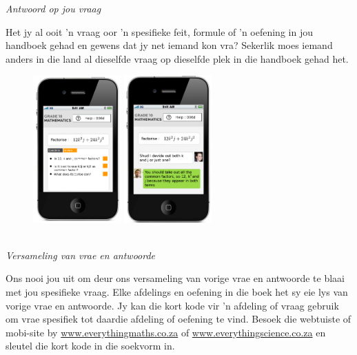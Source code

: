 

\newpage
\thispagestyle{empty}

{\normalfont\sffamily\fontsize{22}\normalfont\itshape Antwoord op jou vraag} \par


{\normalsize

Het jy al ooit ’n vraag oor 'n spesifieke feit, formule of ’n oefening in jou handboek gehad en gewens
dat jy net iemand kon vra? Sekerlik moes iemand anders in die land al dieselfde vraag op dieselfde plek
in die handboek gehad het.

\begin{figure}[h]
\centering
\includegraphics[width=0.3\textwidth]{title_images/QADatabase2.png}
\includegraphics[width=0.3\textwidth]{title_images/AskQuestions3.png}
\end{figure}

\vspace{0.7cm}\\
{\normalfont\sffamily\fontsize{16}\normalfont\itshape Versameling van vrae en antwoorde} \par
Ons nooi jou uit om deur ons versameling van vorige vrae en antwoorde te blaai met jou spesifieke
vraag. Elke afdelings en oefening in die boek het sy eie lys van vorige vrae en antwoorde. Jy kan die
kort kode vir 'n afdeling of vraag gebruik om vrae spesifiek tot daardie afdeling of oefening te vind.
Besoek die webtuiste of mobi-site by \underline{www.everythingmaths.co.za} of \underline{www.everythingscience.co.za} en
sleutel die kort kode in die soekvorm in.
\par

}
